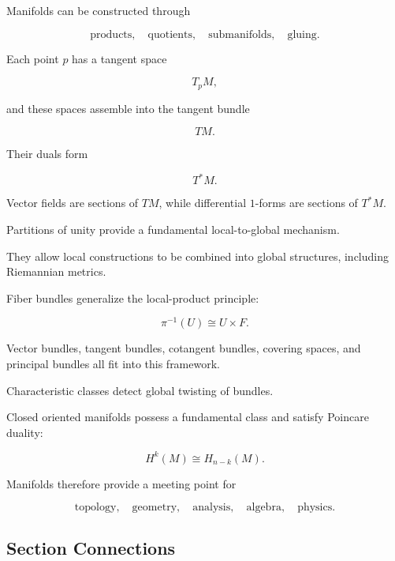 Manifolds can be constructed through

\[
\boxed{
\text{products},
\quad
\text{quotients},
\quad
\text{submanifolds},
\quad
\text{gluing}.
}
\]

Each point \(p\) has a tangent space

\[
\boxed{
T_pM,
}
\]

and these spaces assemble into the tangent bundle

\[
\boxed{
TM.
}
\]

Their duals form

\[
\boxed{
T^*M.
}
\]

Vector fields are sections of \(TM\), while differential \(1\)-forms are
sections of \(T^*M\).

Partitions of unity provide a fundamental local-to-global mechanism.

They allow local constructions to be combined into global structures,
including Riemannian metrics.

Fiber bundles generalize the local-product principle:

\[
\boxed{
\pi^{-1}(U)\cong U\times F.
}
\]

Vector bundles, tangent bundles, cotangent bundles, covering spaces, and
principal bundles all fit into this framework.

Characteristic classes detect global twisting of bundles.

Closed oriented manifolds possess a fundamental class and satisfy
Poincare duality:

\[
\boxed{
H^k(M)\cong H_{n-k}(M).
}
\]

Manifolds therefore provide a meeting point for

\[
\boxed{
\text{topology},
\quad
\text{geometry},
\quad
\text{analysis},
\quad
\text{algebra},
\quad
\text{physics}.
}
\]

\subsection{Section Connections}
\label{subsec:manifolds-connections}


